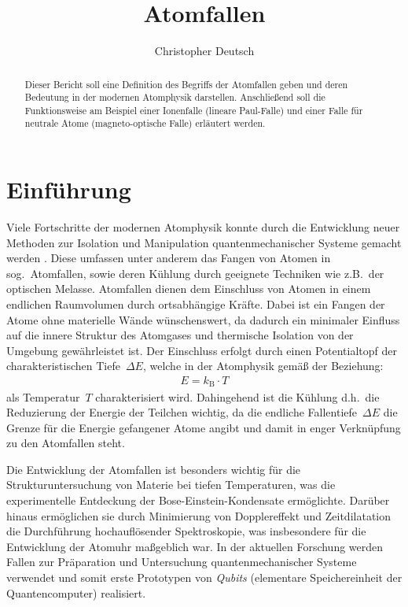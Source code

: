 \documentclass[twocolumn]{revtex4}
\begin{document}
\title{Atomfallen}

\author{Christopher Deutsch}




\begin{abstract}
%
Dieser Bericht soll eine Definition des Begriffs der Atomfallen geben und deren Bedeutung in der modernen Atomphysik darstellen. Anschließend soll die Funktionsweise am Beispiel einer Ionenfalle (lineare Paul-Falle) und einer Falle für neutrale Atome (magneto-optische Falle) erläutert werden.
%
\end{abstract}

\maketitle

\section{Einführung}
Viele Fortschritte der modernen Atomphysik konnte durch die Entwicklung neuer Methoden zur Isolation und Manipulation quantenmechanischer Systeme gemacht werden \cite{trapping}.
Diese umfassen unter anderem das Fangen von Atomen in sog.~Atomfallen, sowie deren Kühlung durch geeignete Techniken wie z.B.\ der optischen Melasse.
Atomfallen dienen dem Einschluss von Atomen in einem endlichen Raumvolumen durch ortsabhängige Kräfte. 
Dabei ist ein Fangen der Atome ohne materielle Wände wünschenswert, da dadurch ein minimaler Einfluss auf die innere Struktur des Atomgases und thermische Isolation von der Umgebung gewährleistet ist.
Der Einschluss erfolgt durch einen Potentialtopf der charakteristischen Tiefe~$\Delta E$, welche in der Atomphysik gemäß der Beziehung:
\begin{align}
	E = k_\mathrm{B} \cdot T
\end{align}
als Temperatur~$T$ charakterisiert wird.
Dahingehend ist die Kühlung d.h.\ die Reduzierung der Energie der Teilchen wichtig, da die endliche Fallentiefe~$\Delta E$ die Grenze für die Energie gefangener Atome angibt und damit in enger Verknüpfung zu den Atomfallen steht.

Die Entwicklung der Atomfallen ist besonders wichtig für die Strukturuntersuchung von Materie bei tiefen Temperaturen, was die experimentelle Entdeckung der Bose-Einstein-Kondensate ermöglichte.
Darüber hinaus ermöglichen sie durch Minimierung von Dopplereffekt und Zeitdilatation die Durchführung hochauflösender Spektroskopie, was insbesondere für die Entwicklung der Atomuhr maßgeblich war.
In der aktuellen Forschung werden Fallen zur Präparation und Untersuchung quantenmechanischer Systeme verwendet und somit erste Prototypen von \emph{Qubits} (elementare Speichereinheit der Quantencomputer) realisiert.
\end{document}
